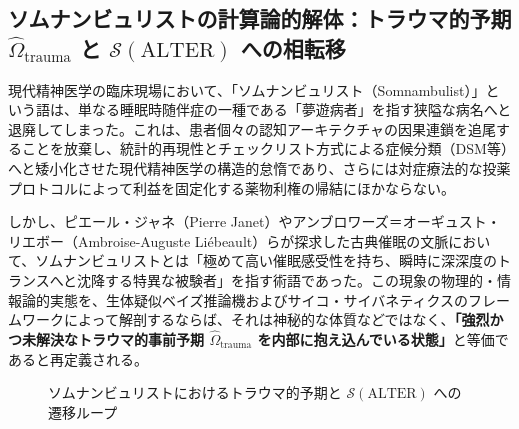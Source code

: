 \subsection{ソムナンビュリストの計算論的解体：トラウマ的予期 $\hat{\Omega}_{\mathrm{trauma}}$ と $\mathcal{S}(\mathrm{ALTER})$ への相転移}

現代精神医学の臨床現場において、「ソムナンビュリスト（Somnambulist）」という語は、単なる睡眠時随伴症の一種である「夢遊病者」を指す狭隘な病名へと退廃してしまった。これは、患者個々の認知アーキテクチャの因果連鎖を追尾することを放棄し、統計的再現性とチェックリスト方式による症候分類（DSM等）へと矮小化させた現代精神医学の構造的怠惰であり、さらには対症療法的な投薬プロトコルによって利益を固定化する薬物利権の帰結にほかならない。

しかし、ピエール・ジャネ（Pierre Janet）やアンブロワーズ＝オーギュスト・リエボー（Ambroise-Auguste Liébeault）らが探求した古典催眠の文脈において、ソムナンビュリストとは「極めて高い催眠感受性を持ち、瞬時に深深度のトランスへと沈降する特異な被験者」を指す術語であった。この現象の物理的・情報論的実態を、生体疑似ベイズ推論機およびサイコ・サイバネティクスのフレームワークによって解剖するならば、それは神秘的な体質などではなく、\textbf{「強烈かつ未解決なトラウマ的事前予期 $\hat{\Omega}_{\mathrm{trauma}}$ を内部に抱え込んでいる状態」}と等価であると再定義される。

\begin{figure}[htbp]
\centering
{}
\caption{ソムナンビュリストにおけるトラウマ的予期と $\mathcal{S}(\mathrm{ALTER})$ への遷移ループ}
\label{fig:somnambulist_loop}
\end{figure}


